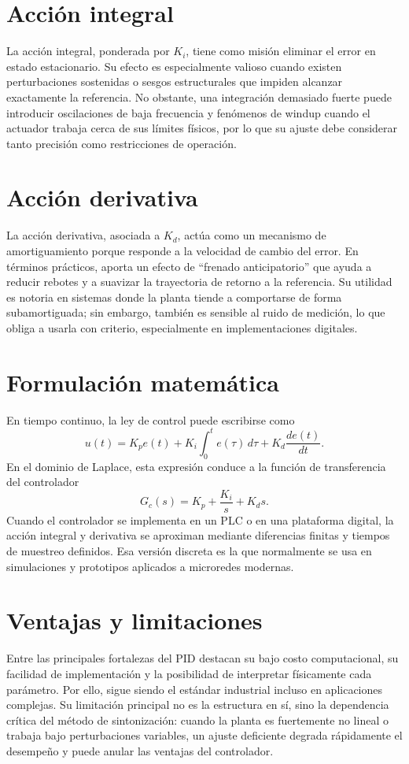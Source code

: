 \section{Acción integral}
La acción integral, ponderada por $K_i$, tiene como misión eliminar el error en estado
estacionario. Su efecto es especialmente valioso cuando existen perturbaciones sostenidas o
sesgos estructurales que impiden alcanzar exactamente la referencia. No obstante, una
integración demasiado fuerte puede introducir oscilaciones de baja frecuencia y fenómenos de
windup cuando el actuador trabaja cerca de sus límites físicos, por lo que su ajuste debe
considerar tanto precisión como restricciones de operación.

\section{Acción derivativa}
La acción derivativa, asociada a $K_d$, actúa como un mecanismo de amortiguamiento porque
responde a la velocidad de cambio del error. En términos prácticos, aporta un efecto de
``frenado anticipatorio'' que ayuda a reducir rebotes y a suavizar la trayectoria de retorno a la
referencia. Su utilidad es notoria en sistemas donde la planta tiende a comportarse de forma
subamortiguada; sin embargo, también es sensible al ruido de medición, lo que obliga a usarla
con criterio, especialmente en implementaciones digitales.

\section{Formulación matemática}
En tiempo continuo, la ley de control puede escribirse como
\[
u(t)=K_p e(t)+K_i \int_0^t e(\tau)\,d\tau +K_d \frac{de(t)}{dt}.
\]
En el dominio de Laplace, esta expresión conduce a la función de transferencia del
controlador
\[
G_c(s)=K_p+\frac{K_i}{s}+K_d s.
\]
Cuando el controlador se implementa en un PLC o en una plataforma digital, la acción integral
y derivativa se aproximan mediante diferencias finitas y tiempos de muestreo definidos. Esa
versión discreta es la que normalmente se usa en simulaciones y prototipos aplicados a
microredes modernas.

\section{Ventajas y limitaciones}
Entre las principales fortalezas del PID destacan su bajo costo computacional, su facilidad de
implementación y la posibilidad de interpretar físicamente cada parámetro. Por ello, sigue
siendo el estándar industrial incluso en aplicaciones complejas. Su limitación principal no es
la estructura en sí, sino la dependencia crítica del método de sintonización: cuando la planta
es fuertemente no lineal o trabaja bajo perturbaciones variables, un ajuste deficiente degrada
rápidamente el desempeño y puede anular las ventajas del controlador.

